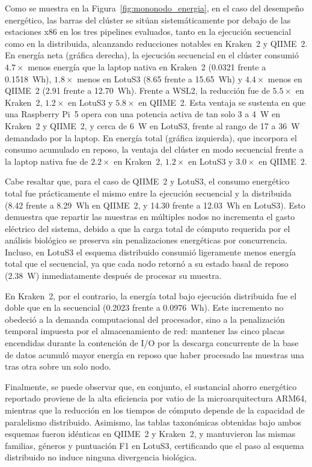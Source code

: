\documentclass[12pt,oneside,spanish]{book}
\begin{document}
    
    Como se muestra en la Figura~\ref{fig:mononodo_energia}, en el caso del desempeño energético, las barras del clúster se sitúan sistemáticamente por debajo de las estaciones x86 en los tres pipelines evaluados, tanto en la ejecución secuencial como en la distribuida, alcanzando reducciones notables en Kraken~2 y QIIME~2. En energía neta (gráfica derecha), la ejecución secuencial en el clúster consumió $4.7\times$ menos energía que la laptop nativa en Kraken~2 (0.0321 frente a 0.1518~Wh), $1.8\times$ menos en LotuS3 (8.65 frente a 15.65~Wh) y $4.4\times$ menos en QIIME~2 (2.91 frente a 12.70~Wh). Frente a WSL2, la reducción fue de $5.5\times$ en Kraken~2, $1.2\times$ en LotuS3 y $5.8\times$ en QIIME~2. Esta ventaja se sustenta en que una Raspberry Pi~5 opera con una potencia activa de tan solo 3 a 4~W en Kraken~2 y QIIME~2, y cerca de 6~W en LotuS3, frente al rango de 17 a 36~W demandado por la laptop. En energía total (gráfica izquierda), que incorpora el consumo acumulado en reposo, la ventaja del clúster en modo secuencial frente a la laptop nativa fue de $2.2\times$ en Kraken~2, $1.2\times$ en LotuS3 y $3.0\times$ en QIIME~2.

    Cabe resaltar que, para el caso de QIIME~2 y LotuS3, el consumo energético total fue prácticamente el mismo entre la ejecución secuencial y la distribuida (8.42 frente a 8.29~Wh en QIIME~2, y 14.30 frente a 12.03~Wh en LotuS3). Esto demuestra que repartir las muestras en múltiples nodos no incrementa el gasto eléctrico del sistema, debido a que la carga total de cómputo requerida por el análisis biológico se preserva sin penalizaciones energéticas por concurrencia. Incluso, en LotuS3 el esquema distribuido consumió ligeramente menos energía total que el secuencial, ya que cada nodo retornó a su estado basal de reposo (2.38~W) inmediatamente después de procesar su muestra.

    En Kraken~2, por el contrario, la energía total bajo ejecución distribuida fue el doble que en la secuencial (0.2023 frente a 0.0976~Wh). Este incremento no obedeció a la demanda computacional del procesador, sino a la penalización temporal impuesta por el almacenamiento de red: mantener las cinco placas encendidas durante la contención de I/O por la descarga concurrente de la base de datos acumuló mayor energía en reposo que haber procesado las muestras una tras otra sobre un solo nodo.

    Finalmente, se puede observar que, en conjunto, el sustancial ahorro energético reportado proviene de la alta eficiencia por vatio de la microarquitectura ARM64, mientras que la reducción en los tiempos de cómputo depende de la capacidad de paralelismo distribuido. Asimismo, las tablas taxonómicas obtenidas bajo ambos esquemas fueron idénticas en QIIME~2 y Kraken~2, y mantuvieron las mismas familias, géneros y puntuación F1 en LotuS3, certificando que el paso al esquema distribuido no induce ninguna divergencia biológica.
\end{document}
